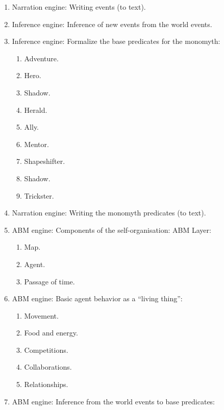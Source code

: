 \documentclass[a4paper]{article}
\newcommand\liststyleLx{%
\renewcommand\theenumi{\arabic{enumi}}
\renewcommand\theenumii{\arabic{enumii}}
\renewcommand\theenumiii{\arabic{enumiii}}
\renewcommand\theenumiv{\arabic{enumiv}}
\renewcommand\labelenumi{\theenumi.}
\renewcommand\labelenumii{\theenumii.}
\renewcommand\labelenumiii{\theenumiii.}
\renewcommand\labelenumiv{\theenumiv.}
}
\begin{document}
\liststyleLx
\begin{enumerate}
\item Narration engine: Writing events (to text). 
\item Inference engine: Inference of new events from the world events. 
\item Inference engine: Formalize the base predicates for the monomyth: 

\begin{enumerate}
\item Adventure. 
\item Hero. 
\item Shadow. 
\item Herald. 
\item Ally. 
\item Mentor. 
\item Shapeshifter. 
\item Shadow. 
\item Trickster. 
\end{enumerate}
\item Narration engine: Writing the monomyth predicates (to text). 
\item ABM engine: Components of the self-organisation: ABM Layer: 

\begin{enumerate}
\item Map. 
\item Agent. 
\item Passage of time. 
\end{enumerate}
\item ABM engine: Basic agent behavior as a {\textquotedblleft}living
thing{\textquotedblright}: 

\begin{enumerate}
\item Movement. 
\item Food and energy. 
\item Competitions. 
\item Collaborations. 
\item Relationships. 
\end{enumerate}
\item ABM engine: Inference from the world events to base predicates: 


\end{enumerate}
\end{document}
